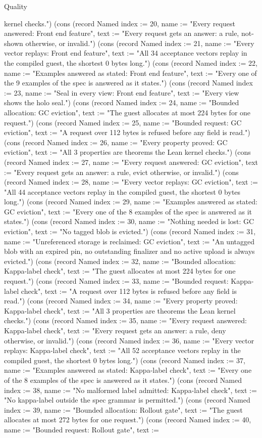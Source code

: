 \begin{lexlean}{Quality}
\begin{semanticmodule}
{kernel checks."}) (cons (record Named {index := 20, name := "Every request answered: Front end feature", text := "Every request gets an answer: a rule, not-shown otherwise, or invalid."}) (cons (record Named {index := 21, name := "Every vector replays: Front end feature", text := "All 34 acceptance vectors replay in the compiled guest, the shortest 0 bytes long."}) (cons (record Named {index := 22, name := "Examples answered as stated: Front end feature", text := "Every one of the 9 examples of the spec is answered as it states."}) (cons (record Named {index := 23, name := "Seal in every view: Front end feature", text := "Every view shows the holo seal."}) (cons (record Named {index := 24, name := "Bounded allocation: GC eviction", text := "The guest allocates at most 224 bytes for one request."}) (cons (record Named {index := 25, name := "Bounded request: GC eviction", text := "A request over 112 bytes is refused before any field is read."}) (cons (record Named {index := 26, name := "Every property proved: GC eviction", text := "All 3 properties are theorems the Lean kernel checks."}) (cons (record Named {index := 27, name := "Every request answered: GC eviction", text := "Every request gets an answer: a rule, evict otherwise, or invalid."}) (cons (record Named {index := 28, name := "Every vector replays: GC eviction", text := "All 44 acceptance vectors replay in the compiled guest, the shortest 0 bytes long."}) (cons (record Named {index := 29, name := "Examples answered as stated: GC eviction", text := "Every one of the 8 examples of the spec is answered as it states."}) (cons (record Named {index := 30, name := "Nothing needed is lost: GC eviction", text := "No tagged blob is evicted."}) (cons (record Named {index := 31, name := "Unreferenced storage is reclaimed: GC eviction", text := "An untagged blob with an expired pin, no outstanding finalizer and no active upload is always evicted."}) (cons (record Named {index := 32, name := "Bounded allocation: Kappa-label check", text := "The guest allocates at most 224 bytes for one request."}) (cons (record Named {index := 33, name := "Bounded request: Kappa-label check", text := "A request over 112 bytes is refused before any field is read."}) (cons (record Named {index := 34, name := "Every property proved: Kappa-label check", text := "All 3 properties are theorems the Lean kernel checks."}) (cons (record Named {index := 35, name := "Every request answered: Kappa-label check", text := "Every request gets an answer: a rule, deny otherwise, or invalid."}) (cons (record Named {index := 36, name := "Every vector replays: Kappa-label check", text := "All 52 acceptance vectors replay in the compiled guest, the shortest 0 bytes long."}) (cons (record Named {index := 37, name := "Examples answered as stated: Kappa-label check", text := "Every one of the 8 examples of the spec is answered as it states."}) (cons (record Named {index := 38, name := "No malformed label admitted: Kappa-label check", text := "No kappa-label outside the spec grammar is permitted."}) (cons (record Named {index := 39, name := "Bounded allocation: Rollout gate", text := "The guest allocates at most 272 bytes for one request."}) (cons (record Named {index := 40, name := "Bounded request: Rollout gate", text := }
\end{semanticmodule}
\end{lexlean}
